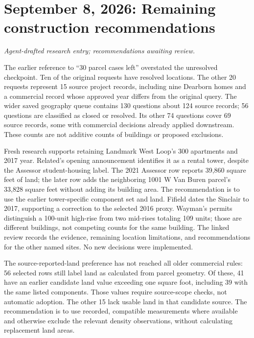 \clearpage
\section*{September 8, 2026: Remaining construction recommendations}
\textit{Agent-drafted research entry; recommendations awaiting review.}

The earlier reference to ``30 parcel cases left'' overstated the unresolved
checkpoint. Ten of the original requests have resolved locations. The other
20 requests represent 15 source project records, including nine Dearborn homes
and a commercial record whose approved year differs from the original query.
The wider saved geography queue contains 130 questions about 124 source records;
56 questions are classified as closed or resolved. Its other 74 questions cover
69 source records, some with commercial decisions already applied downstream.
These counts are not additive counts of buildings or proposed exclusions.

Fresh research supports retaining Landmark West Loop's 300 apartments and 2017
year. Related's opening announcement identifies it as a rental tower, despite
the Assessor student-housing label. The 2021 Assessor row reports 39,860 square
feet of land; the later row adds the neighboring 1001 W Van Buren parcel's
33,828 square feet without adding its building area. The recommendation is to
use the earlier tower-specific component set and land. Fifield dates the
Sinclair to 2017, supporting a correction to the selected 2016 proxy. Wayman's
permits distinguish a 100-unit high-rise from two mid-rises totaling 109 units;
those are different buildings, not competing counts for the same building.
The linked review records the evidence, remaining location limitations, and
recommendations for the other named sites. No new decisions were implemented.

The source-reported-land preference has not reached all older commercial rules:
56 selected rows still label land as calculated from parcel geometry. Of these,
41 have an earlier candidate land value exceeding one square foot, including
39 with the same listed components. Those values require source-scope checks,
not automatic adoption. The other 15 lack usable land in that candidate source.
The recommendation is to use recorded, compatible measurements where available
and otherwise exclude the relevant density observations, without calculating
replacement land areas.

